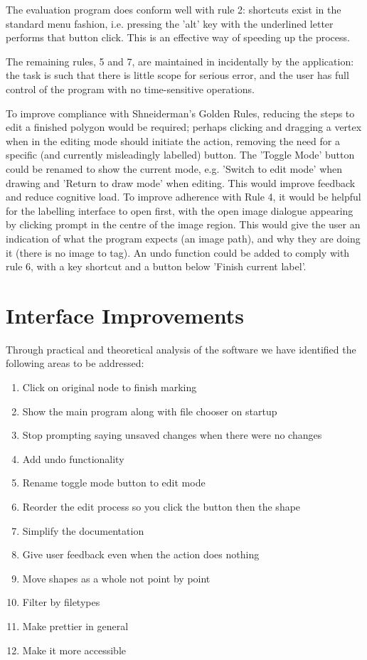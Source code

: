 \documentclass[a4paper,11pt,oneside]{article}
\begin{document}
The evaluation program does conform well with rule 2: shortcuts exist in the standard menu fashion, i.e. pressing the 'alt' key with the underlined letter performs that button click. This is an effective way of speeding up the process.

The remaining rules, 5 and 7, are maintained in incidentally by the application: the task is such that there is little scope for serious error, and the user has full control of the program with no time-sensitive operations.

To improve compliance with Shneiderman's Golden Rules, reducing the steps to edit a finished polygon would be required; perhaps clicking and dragging a vertex when in the editing mode should initiate the action, removing the need for a specific (and currently misleadingly labelled) button. The 'Toggle Mode' button could be renamed to show the current mode, e.g. 'Switch to edit mode' when drawing and 'Return to draw mode' when editing. This would improve feedback and reduce cognitive load. To improve adherence with Rule 4, it would be helpful for the labelling interface to open first, with the open image dialogue appearing by clicking prompt in the centre of the image region. This would give the user an indication of what the program expects (an image path), and why they are doing it (there is no image to tag). An undo function could be added to comply with rule 6, with a key shortcut and a button below 'Finish current label'.

\section{Interface Improvements}
Through practical and theoretical analysis of the software we have identified the following areas to be addressed:
\begin{enumerate}
\item{Click on original node to finish marking}
\item{Show the main program along with file chooser on startup}
\item{Stop prompting saying unsaved changes when there were no changes}
\item{Add undo functionality}
\item{Rename toggle mode button to edit mode}
\item{Reorder the edit process so you click the button then the shape}
\item{Simplify the documentation}
\item{Give user feedback even when the action does nothing}
\item{Move shapes as a whole not point by point}
\item{Filter by filetypes}
\item{Make prettier in general}
\item{Make it more accessible}
\end{enumerate}
\end{document}
